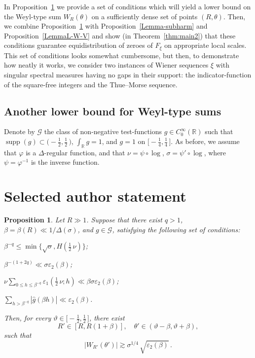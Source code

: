 \documentclass[10pt,a4paper]{amsart}
\newtheorem{proposition}{Proposition}
\def\ep{{\varepsilon}}
\newcommand{\bR}{\mathbb R}
\begin{document}
In Proposition~\ref{Lemma5a} we provide a set of conditions which will yield a lower
bound on the Weyl-type sum $W_R(\theta)$ on a sufficiently dense set of points
$(R, \theta)$. Then, we combine Proposition~\ref{Lemma5a} with Proposition~\ref{Lemma-subharm} and Proposition~\ref{LemmaL-W-V} and show (in Theorem~\ref{thm:main2}) that these
conditions guarantee equidistribution of zeroes of $F_\xi$ on appropriate local scales.
This set of conditions looks somewhat cumbersome, but then, to demonstrate how neatly it works,
we consider two instances of Wiener sequences $\xi$  with singular spectral measures
having no gaps in their support: the indicator-function of the square-free integers
and the Thue--Morse sequence.

\subsection{Another lower bound for Weyl-type sums}
\label{subsec:LB-general}

Denote by $\mathcal G$ the class of non-negative test-functions $g\in C_0^\infty (\bR)$ such that
$\operatorname{supp}(g)\subset \bigl(-\tfrac12, \tfrac12\, \bigr)$, $\displaystyle \int_\bR g = 1$, and
$g=1$ on $\bigl[-\tfrac14, \tfrac14\, \bigr]$.
As before, we assume that $\varphi$ is a $\Delta$-regular function, and
that $\nu = \psi\circ\log$, $\sigma=\psi'\circ\log$, where $\psi=\varphi^{-1}$ is the inverse
function.

\section*{Selected author statement}
\begin{proposition}\label{Lemma5a}
Let $R\gg 1$. Suppose that there exist $q>1$, $\beta=\beta(R)\ll 1/\Delta(\sigma)$,
and $g\in \mathcal G$, satisfying the following set of conditions:

\smallskip{}
$\beta^{-q} \le \min\bigl\{\sqrt{\sigma}, H(\tfrac12\, \nu)\bigr\}$;

\medskip{}
$\beta^{-(1+2q)} \ll \sigma\ep_2(\beta)$;

\medskip{}
$\displaystyle \nu \sum_{0\le h \le \beta^{-q}} \ep_1(\tfrac12\, \nu; h) \ll \beta\sigma\ep_2(\beta) $;

\medskip{}
$\displaystyle \sum_{h>\beta^{-q}} |\widehat{g}(\beta h)| \ll \ep_2(\beta) $.

\smallskip
Then, for every $\vartheta\in \bigl[-\tfrac12,  \tfrac12\, \bigr]$, there exist
\[
R'\in [R, R(1+\beta)],  \quad \theta'\in (\vartheta-\beta, \vartheta+\beta),
\]
such that
\[
|W_{R'}(\theta')| \gtrsim \sigma^{1/4}\, \sqrt{\ep_2 (\beta)}\,.
\]
\end{proposition}
\end{document}
